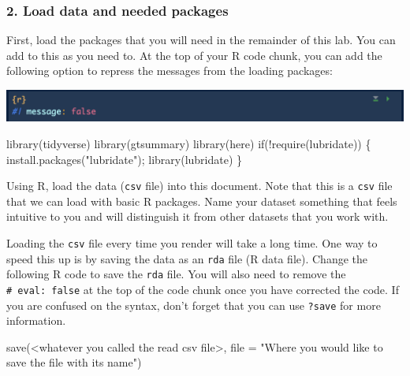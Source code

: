 \documentclass[
  letterpaper,
  DIV=11,
  numbers=noendperiod]{scrartcl}
\newenvironment{Shaded}{\begin{snugshade}}{\end{snugshade}}
\newcommand{\AttributeTok}[1]{\textcolor[rgb]{0.40,0.45,0.13}{#1}}
\newcommand{\ControlFlowTok}[1]{\textcolor[rgb]{0.00,0.23,0.31}{#1}}
\newcommand{\FunctionTok}[1]{\textcolor[rgb]{0.28,0.35,0.67}{#1}}
\newcommand{\NormalTok}[1]{\textcolor[rgb]{0.00,0.23,0.31}{#1}}
\newcommand{\SpecialCharTok}[1]{\textcolor[rgb]{0.37,0.37,0.37}{#1}}
\newcommand{\StringTok}[1]{\textcolor[rgb]{0.13,0.47,0.30}{#1}}
\begin{document}
\hypertarget{load-data-and-needed-packages}{%
\subsubsection{2. Load data and needed
packages}\label{load-data-and-needed-packages}}

First, load the packages that you will need in the remainder of this
lab. You can add to this as you need to. At the top of your R code
chunk, you can add the following option to repress the messages from the
loading packages:

\includegraphics{images/r_message.png}

\begin{Shaded}
\begin{Highlighting}[]
\FunctionTok{library}\NormalTok{(tidyverse)}
\FunctionTok{library}\NormalTok{(gtsummary)}
\FunctionTok{library}\NormalTok{(here)}
\ControlFlowTok{if}\NormalTok{(}\SpecialCharTok{!}\FunctionTok{require}\NormalTok{(lubridate)) \{ }\FunctionTok{install.packages}\NormalTok{(}\StringTok{"lubridate"}\NormalTok{); }\FunctionTok{library}\NormalTok{(lubridate) \}}
\end{Highlighting}
\end{Shaded}

Using R, load the data (\texttt{csv} file) into this document. Note that
this is a \texttt{csv} file that we can load with basic R packages. Name
your dataset something that feels intuitive to you and will distinguish
it from other datasets that you work with.

Loading the \texttt{csv} file every time you render will take a long
time. One way to speed this up is by saving the data as an \texttt{rda}
file (R data file). Change the following R code to save the \texttt{rda}
file. You will also need to remove the
\texttt{\#\textbar{}\ eval:\ false} at the top of the code chunk once
you have corrected the code. If you are confused on the syntax, don't
forget that you can use \texttt{?save} for more information.

\begin{Shaded}
\begin{Highlighting}[]
\FunctionTok{save}\NormalTok{(}\SpecialCharTok{\textless{}}\NormalTok{whatever you called the read csv file}\SpecialCharTok{\textgreater{}}\NormalTok{, }\AttributeTok{file =} \StringTok{"Where you would like to save the file with its name"}\NormalTok{)}
\end{Highlighting}
\end{Shaded}
\end{document}
